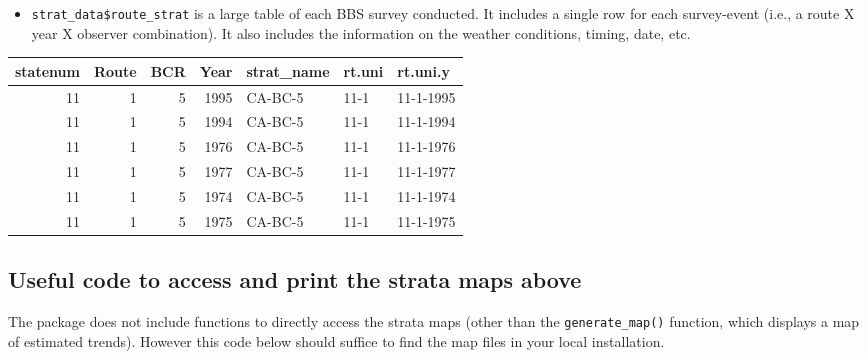 \documentclass[
]{book}
\newenvironment{Shaded}{\begin{snugshade}}{\end{snugshade}}
\newcommand{\DecValTok}[1]{\textcolor[rgb]{0.00,0.00,0.81}{#1}}
\newcommand{\FunctionTok}[1]{\textcolor[rgb]{0.00,0.00,0.00}{#1}}
\newcommand{\NormalTok}[1]{#1}
\newcommand{\SpecialCharTok}[1]{\textcolor[rgb]{0.00,0.00,0.00}{#1}}
\providecommand{\tightlist}{%
  \setlength{\itemsep}{0pt}\setlength{\parskip}{0pt}}
\begin{document}
\begin{itemize}
\tightlist
\item
  \texttt{strat\_data\$route\_strat} is a large table of each BBS survey conducted. It includes a single row for each survey-event (i.e., a route X year X observer combination). It also includes the information on the weather conditions, timing, date, etc.
\end{itemize}

\begin{Shaded}
\end{Shaded}

\begin{tabular}{r|r|r|r|l|l|l}
\hline
statenum & Route & BCR & Year & strat\_name & rt.uni & rt.uni.y\\
\hline
11 & 1 & 5 & 1995 & CA-BC-5 & 11-1 & 11-1-1995\\
\hline
11 & 1 & 5 & 1994 & CA-BC-5 & 11-1 & 11-1-1994\\
\hline
11 & 1 & 5 & 1976 & CA-BC-5 & 11-1 & 11-1-1976\\
\hline
11 & 1 & 5 & 1977 & CA-BC-5 & 11-1 & 11-1-1977\\
\hline
11 & 1 & 5 & 1974 & CA-BC-5 & 11-1 & 11-1-1974\\
\hline
11 & 1 & 5 & 1975 & CA-BC-5 & 11-1 & 11-1-1975\\
\hline
\end{tabular}

\hypertarget{useful-code-to-access-and-print-the-strata-maps-above}{%
\subsection{Useful code to access and print the strata maps above}\label{useful-code-to-access-and-print-the-strata-maps-above}}

The package does not include functions to directly access the strata maps (other than the \texttt{generate\_map()} function, which displays a map of estimated trends). However this code below should suffice to find the map files in your local installation.
\end{document}
